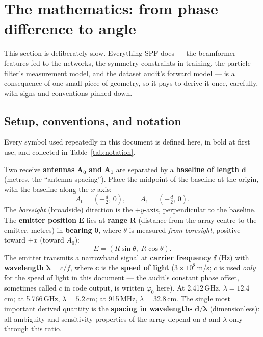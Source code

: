 \section{The mathematics: from phase difference to angle}
\label{sec:math}

This section is deliberately slow. Everything SPF does --- the beamformer
features fed to the networks, the symmetry constraints in training, the
particle filter's measurement model, and the dataset audit's forward model ---
is a consequence of one small piece of geometry, so it pays to derive it once,
carefully, with signs and conventions pinned down.

\subsection{Setup, conventions, and notation}
\label{sec:setup}

Every symbol used repeatedly in this document is defined here, in bold at
first use, and collected in Table~\ref{tab:notation}.

Two receive \textbf{antennas} $\bm{A_0}$ \textbf{and} $\bm{A_1}$ are separated
by a \textbf{baseline of length} $\bm{d}$ (metres, the ``antenna spacing'').
Place the midpoint of the baseline at the origin, with the baseline along the
$x$-axis:
\[
A_0 = \left(+\tfrac{d}{2},\, 0\right), \qquad
A_1 = \left(-\tfrac{d}{2},\, 0\right).
\]
The \emph{boresight} (broadside) direction is the $+y$-axis, perpendicular to
the baseline. The \textbf{emitter position} $\bm{E}$ lies at \textbf{range}
$\bm{R}$ (distance from the array centre to the emitter, metres) in
\textbf{bearing} $\bm{\theta}$, where $\theta$ is measured \emph{from
boresight}, positive toward $+x$ (toward $A_0$):
\[
E = (R\sin\theta,\; R\cos\theta).
\]
The emitter transmits a narrowband signal at \textbf{carrier frequency}
$\bm{f}$ (Hz) with \textbf{wavelength} $\bm{\lambda} = c/f$, where $\bm{c}$
is the \textbf{speed of light} ($3\times10^8$\,m/s; $c$ is used \emph{only}
for the speed of light in this document --- the audit's constant phase offset,
sometimes called $c$ in code output, is written $\varphi_0$ here). At
2.412\,GHz, $\lambda = 12.4$\,cm; at 5.766\,GHz, $\lambda = 5.2$\,cm; at
915\,MHz, $\lambda = 32.8$\,cm. The single most important derived quantity is
the \textbf{spacing in wavelengths} $\bm{d/\lambda}$ (dimensionless): all
ambiguity and sensitivity properties of the array depend on $d$ and $\lambda$
only through this ratio.

